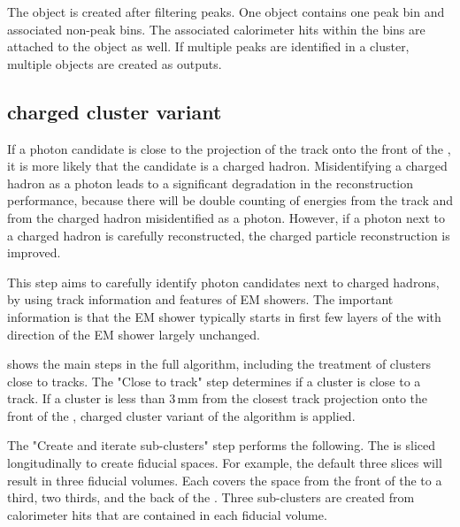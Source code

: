 The \ShowerPeak  object is created after  filtering peaks. One \ShowerPeak object contains one peak bin and associated non-peak bins. The associated calorimeter hits within the bins are attached to the \ShowerPeak object as well. If multiple peaks are identified in a cluster, multiple \ShowerPeak objects are created as outputs.



\subsection{\peakFinding charged cluster variant}
\label{sec:photon2Dtrack}
If  a photon candidate is close to the projection of the track onto the front of the \ECAL, it is more likely that the candidate is a charged hadron. Misidentifying a charged hadron as a photon leads to a significant degradation in the reconstruction performance, because there will be double counting of energies from the track and from the charged hadron misidentified as a photon. However, if a photon next to a charged hadron is carefully reconstructed, the charged particle reconstruction is improved.

This step aims to carefully identify photon candidates next to charged hadrons, by using track information and features of EM showers. The important information is that the EM shower typically starts in first few layers of the \ECAL with direction of the EM shower largely unchanged.


 shows the main steps in the full \peakFinding algorithm, including the treatment of clusters close to tracks. The "Close to track" step determines if a cluster is close to a track. If a cluster is less than 3\,mm from the closest track projection onto the front of the \ECAL, charged cluster variant of the \peakFinding algorithm is applied.



The "Create and iterate sub-clusters" step performs the following. The \ECAL is sliced longitudinally to create fiducial spaces. For example, the default three slices will result in three \ECAL fiducial volumes. Each covers the  space from the front of the \ECAL to a third, two thirds, and the back of the \ECAL. Three sub-clusters are created from calorimeter hits that are contained in each fiducial volume.

